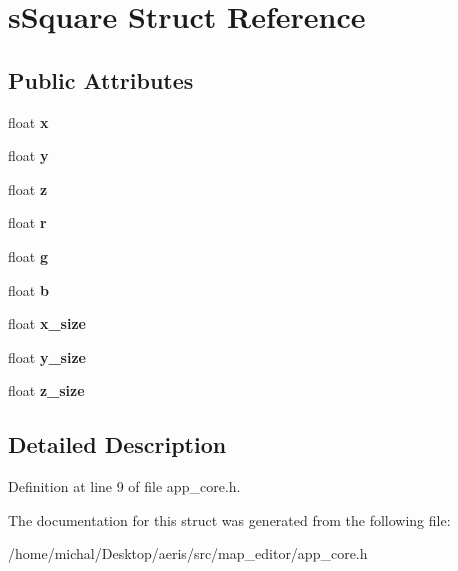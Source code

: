 \hypertarget{structsSquare}{\section{s\-Square Struct Reference}
\label{structsSquare}
}
\subsection*{Public Attributes}
\begin{DoxyCompactItemize}
\item 
\hypertarget{structsSquare_a4a2dd9356d4cb1acbf86f030b89822d9}{float {\bfseries x}}\label{structsSquare_a4a2dd9356d4cb1acbf86f030b89822d9}

\item 
\hypertarget{structsSquare_a2fa7edb394b6c87ded17a1ee2c5068b5}{float {\bfseries y}}\label{structsSquare_a2fa7edb394b6c87ded17a1ee2c5068b5}

\item 
\hypertarget{structsSquare_aab96ddab543d8c6d1c93a83f6644c848}{float {\bfseries z}}\label{structsSquare_aab96ddab543d8c6d1c93a83f6644c848}

\item 
\hypertarget{structsSquare_a31b3d5a3a4c151737daf309844daf5fa}{float {\bfseries r}}\label{structsSquare_a31b3d5a3a4c151737daf309844daf5fa}

\item 
\hypertarget{structsSquare_a2b9691ec7db5c116addab6b6f970fb39}{float {\bfseries g}}\label{structsSquare_a2b9691ec7db5c116addab6b6f970fb39}

\item 
\hypertarget{structsSquare_a901968400d6dec96e332e75017951d05}{float {\bfseries b}}\label{structsSquare_a901968400d6dec96e332e75017951d05}

\item 
\hypertarget{structsSquare_a3830c43662fe9362d3df4f7106a6b560}{float {\bfseries x\-\_\-size}}\label{structsSquare_a3830c43662fe9362d3df4f7106a6b560}

\item 
\hypertarget{structsSquare_a3c5c8e92e1884d361d33fc2818177f21}{float {\bfseries y\-\_\-size}}\label{structsSquare_a3c5c8e92e1884d361d33fc2818177f21}

\item 
\hypertarget{structsSquare_a6ddcb8b967bb21ab54f3eb2cd16d198b}{float {\bfseries z\-\_\-size}}\label{structsSquare_a6ddcb8b967bb21ab54f3eb2cd16d198b}

\end{DoxyCompactItemize}


\subsection{Detailed Description}


Definition at line 9 of file app\-\_\-core.\-h.



The documentation for this struct was generated from the following file\-:\begin{DoxyCompactItemize}
\item 
/home/michal/\-Desktop/aeris/src/map\-\_\-editor/app\-\_\-core.\-h\end{DoxyCompactItemize}
